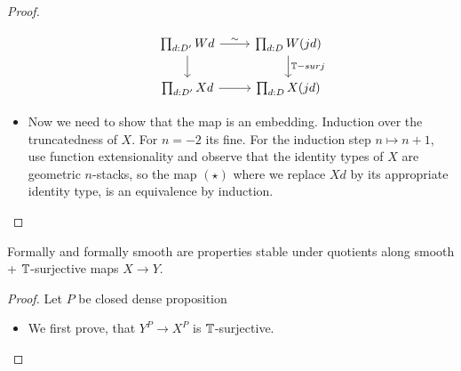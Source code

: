 \begin{proof}
\begin{itemize}
\[\begin{tikzcd}
	{\prod_{d :D'}W d} & {\prod_{d : D} W(jd)} \\
	{\prod_{d :D'} X d} & {\prod_{d : D} X(jd)}
	\arrow["\sim", from=1-1, to=1-2]
	\arrow[from=1-1, to=2-1]
	\arrow["{\bT -surj}", from=1-2, to=2-2]
	\arrow[from=2-1, to=2-2]
\end{tikzcd}\]
\item
Now we need to show that the map is an embedding. Induction over the truncatedness of $X$. For $n=-2$ its fine.
For the induction step $n \mapsto n+1$, use function extensionality and observe that the identity types of $X$ are geometric $n$-stacks, so the map $(\star)$ where we replace $X d$ by its appropriate identity type, is an equivalence by induction.
\end{itemize}
\end{proof}
\begin{lemma}[TODO]
	Formally \etale and formally smooth are properties stable under quotients along smooth + $\mathbb{T}$-surjective maps $X \to Y$.
\end{lemma}
\begin{proof}
	Let $P$ be closed dense proposition
\begin{itemize}
	\item 	We first prove, that $Y^{P} \to X^P$ is $\mathbb{T}$-surjective. 
	
\end{itemize}

	
\end{proof}





